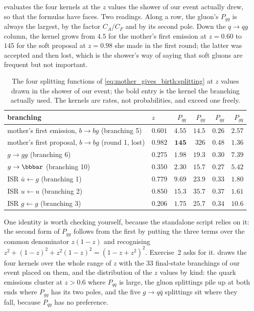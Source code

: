  evaluates the four kernels at the
$z$ values the shower of our event actually drew, so that the formulas
have faces. Two readings. Along a row, the gluon's $P_{gg}$ is always the
largest, by the factor $C_A/C_F$ and by its second pole. Down the
$q\to qg$ column, the kernel grows from $4.5$ for the mother's first
emission at $z=0.60$ to $145$ for the soft proposal at $z=0.98$ she made in
the first round; the latter was accepted and then lost, which is the
shower's way of saying that soft gluons are frequent but not important.

\begin{table}[htbp]\centering\small
\caption[The splitting functions at the $z$ of our event]{The four
splitting functions of \cref{eq:mother_gives_birth:splitting} at $z$
values drawn in the shower of our event; the bold entry is the kernel the
branching actually used. The kernels are rates, not probabilities, and
exceed one freely.}
\label{tab:mother_gives_birth:kernels}
\begin{tabular}{llrrrr}\toprule
branching & $z$ & $P_{qq}$ & $P_{gg}$ & $P_{qg}$ & $P_{gq}$ \\ \midrule
mother's first emission, $b\to bg$ (branching 5) & $0.601$ & $\mathbf{4.55}$ & $14.5$ & $0.26$ & $2.57$ \\
mother's first proposal, $b\to bg$ (round 1, lost) & $0.982$ & $\mathbf{145}$ & $326$ & $0.48$ & $1.36$ \\
$g\to gg$ (branching 6) & $0.275$ & $1.98$ & $\mathbf{19.3}$ & $0.30$ & $7.39$ \\
$g\to \bbbar$ (branching 10) & $0.350$ & $2.30$ & $15.7$ & $\mathbf{0.27}$ & $5.42$ \\
ISR $\bar u\leftarrow g$ (branching 1) & $0.779$ & $9.69$ & $23.9$ & $\mathbf{0.33}$ & $1.80$ \\
ISR $u\leftarrow u$ (branching 2) & $0.850$ & $\mathbf{15.3}$ & $35.7$ & $0.37$ & $1.61$ \\
ISR $g\leftarrow g$ (branching 3) & $0.206$ & $1.75$ & $\mathbf{25.7}$ & $0.34$ & $10.6$ \\
\bottomrule
\end{tabular}
\end{table}

One identity is worth checking yourself, because the standalone script relies
on it: the second form of $P_{gg}$ follows from the first by putting the three
terms over the common denominator $z(1-z)$ and recognising
$z^2+(1-z)^2+z^2(1-z)^2=(1-z+z^2)^2$. Exercise~2 asks for it.
 draws the four kernels over the
whole range of $z$ with the $33$ final-state branchings of our event placed
on them, and the distribution of the $z$ values by kind: the quark
emissions cluster at $z>0.6$ where $P_{qq}$ is large, the gluon splittings
pile up at both ends where $P_{gg}$ has its two poles, and the five
$g\to q\bar q$ splittings sit where they fall, because $P_{qg}$ has no
preference.

